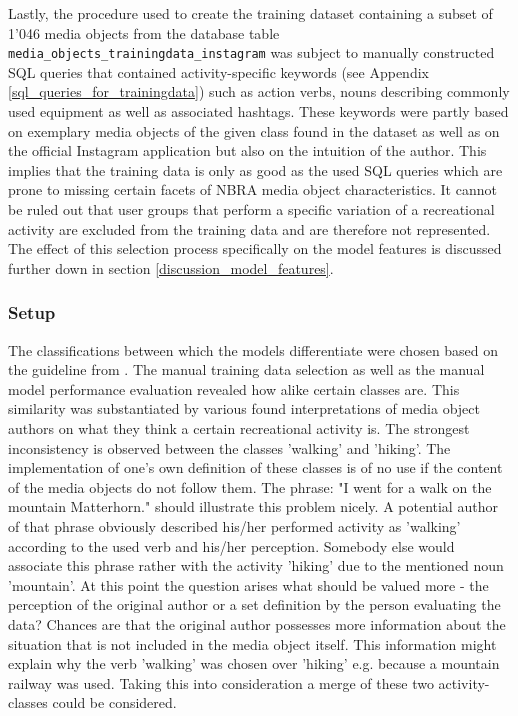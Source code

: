 Lastly, the procedure used to create the training dataset containing a subset of 1'046 media objects from the database table \texttt{media\_objects\_trainingdata\_instagram} was subject to manually constructed SQL queries that contained activity-specific keywords (see Appendix \ref{sql_queries_for_trainingdata}) such as action verbs, nouns describing commonly used equipment as well as associated hashtags. These keywords were partly based on exemplary media objects of the given class found in the dataset as well as on the official Instagram application but also on the intuition of the author. This implies that the training data is only as good as the used SQL queries which are prone to missing certain facets of NBRA media object characteristics. It cannot be ruled out that user groups that perform a specific variation of a recreational activity are excluded from the training data and are therefore not represented. The effect of this selection process specifically on the model features is discussed further down in section \ref{discussion_model_features}.

\subsubsection{Setup} 
The classifications between which the models differentiate were chosen based on the guideline from \textcite{IFL2018}. The manual training data selection as well as the manual model performance evaluation revealed how alike certain classes are. This similarity was substantiated by various found interpretations of media object authors on what they think a certain recreational activity is. The strongest inconsistency is observed between the classes 'walking' and 'hiking'. The implementation of one's own definition of these classes is of no use if the content of the media objects do not follow them. The phrase: "I went for a walk on the mountain Matterhorn." should illustrate this problem nicely. A potential author of that phrase obviously described his/her performed activity as 'walking' according to the used verb and his/her perception. Somebody else would associate this phrase rather with the activity 'hiking' due to the mentioned noun 'mountain'. At this point the question arises what should be valued more - the perception of the original author or a set definition by the person evaluating the data? Chances are that the original author possesses more information about the situation that is not included in the media object itself. This information might explain why the verb 'walking' was chosen over 'hiking' e.g. because a mountain railway was used. Taking this into consideration a merge of these two activity-classes could be considered.

